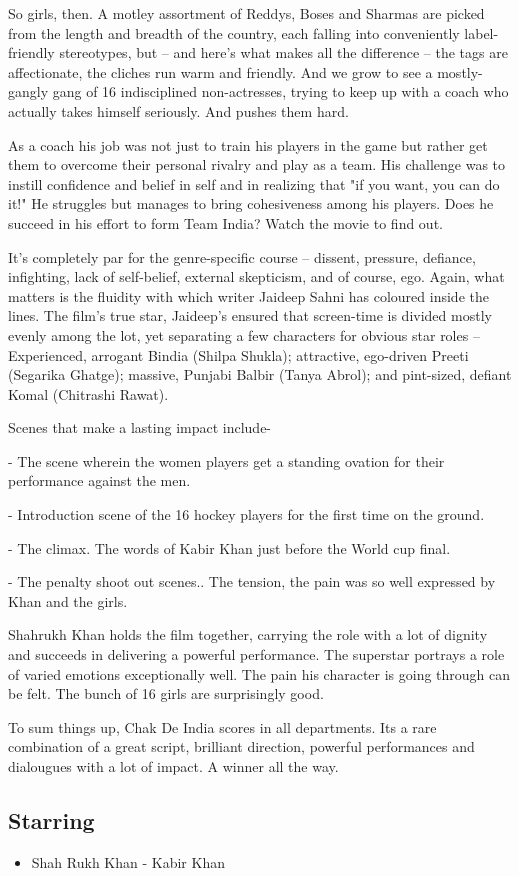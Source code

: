 \documentclass[11pt]{article} %
\begin{document}
So girls, then. A motley assortment of Reddys, Boses and Sharmas are picked from the length and breadth of the country, each falling into conveniently label-friendly stereotypes, but -- and here's what makes all the difference -- the tags are affectionate, the cliches run warm and friendly. And we grow to see a mostly-gangly gang of 16 indisciplined non-actresses, trying to keep up with a coach who actually takes himself seriously. And pushes them hard.

As a coach his job was not just to train his players in the game but rather get them to overcome their personal rivalry and play as a team. His challenge was to instill confidence and belief in self and in realizing that "if you want, you can do it!" He struggles but manages to bring cohesiveness among his players. Does he succeed in his effort to form Team India? Watch the movie to find out.

It's completely par for the genre-specific course -- dissent, pressure, defiance, infighting, lack of self-belief, external skepticism, and of course, ego. Again, what matters is the fluidity with which writer Jaideep Sahni has coloured inside the lines. The film's true star, Jaideep's ensured that screen-time is divided mostly evenly among the lot, yet separating a few characters for obvious star roles -- Experienced, arrogant Bindia (Shilpa Shukla); attractive, ego-driven Preeti (Segarika Ghatge); massive, Punjabi Balbir (Tanya Abrol); and pint-sized, defiant Komal (Chitrashi Rawat).

Scenes that make a lasting impact include-

- The scene wherein the women players get a standing ovation for their performance against the men.

- Introduction scene of the 16 hockey players for the first time on the ground.

- The climax. The words of Kabir Khan just before the World cup final.

- The penalty shoot out scenes.. The tension, the pain was so well expressed by Khan and the girls.

Shahrukh Khan holds the film together, carrying the role with a lot of dignity and succeeds in delivering a powerful performance. The superstar portrays a role of varied emotions exceptionally well. The pain his character is going through can be felt. The bunch of 16 girls are surprisingly good.

To sum things up, Chak De India scores in all departments. Its a rare combination of a great script, brilliant direction, powerful performances and dialougues with a lot of impact. A winner all the way.
\subsection{Starring}
\begin{itemize}
	\item Shah Rukh Khan - Kabir Khan
\end{itemize}
\end{document}
